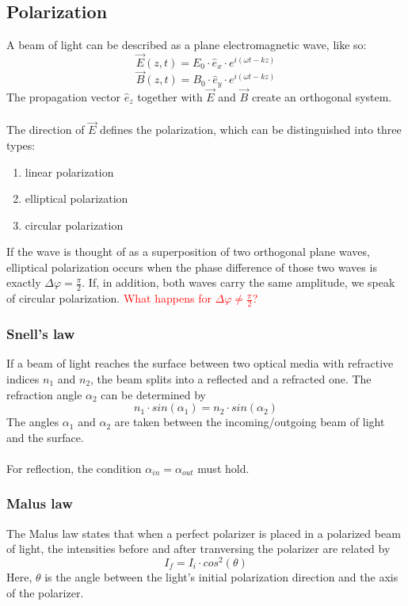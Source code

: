 \subsection{Polarization}

A beam of light can be described as a plane electromagnetic wave, like so:
$$\vec E(z,t)=E_0\cdot\hat e_x\cdot e^{i(\omega t-kz)}$$
$$\vec B(z,t)=B_0\cdot\hat e_y\cdot e^{i(\omega t-kz)}$$
The propagation vector $\hat e_z$ together with $\vec E$ and $\vec B$ create 
an orthogonal system. \\ \\ The direction of $\vec E$ defines the polarization, 
which can be distinguished into three types:
\begin{enumerate}
    \item linear polarization
    \item elliptical polarization
    \item circular polarization
\end{enumerate}
If the wave is thought of as a superposition of two orthogonal plane waves,
elliptical polarization occurs when the phase difference of those two waves
is exactly $\Delta\varphi=\frac{\pi}{2}$. If, in addition, both waves
carry the same amplitude, we speak of circular polarization.
\textcolor{red}{What happens for $\Delta\varphi\neq\frac{\pi}{2}$?}

\subsubsection{Snell's law}
If a beam of light reaches the surface between two optical media with
refractive indices $n_1$ and $n_2$, the beam splits into a reflected and a
refracted one. The refraction angle $\alpha_2$ can be determined by
$$n_1\cdot sin(\alpha_1)=n_2\cdot sin(\alpha_2)$$
The angles $\alpha_1$ and $\alpha_2$ are taken between the
incoming/outgoing beam of light and the surface. \\ \\ For reflection,
the condition $\alpha_{in}=\alpha_{out}$ must hold.

\subsubsection{Malus law}
The Malus law states that when a perfect polarizer is placed in a polarized
beam of light, the intensities before and after tranversing the polarizer
are related by
$$I_f=I_i\cdot cos^2(\theta)$$
Here, $\theta$ is the angle between the light's initial polarization
direction and the axis of the polarizer.

